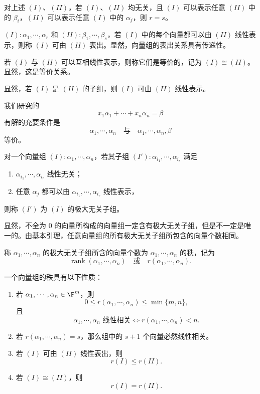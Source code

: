 \begin{corollary}
	对上述 $(I)$、$(II)$，若 $(I)$、$(II)$ 均无关，且 $(I)$ 可以表示任意 $(II)$ 中的 $\beta_i$，$(II)$ 可以表示任意 $(I)$ 中的 $\alpha_j$，则 $r=s$。
\end{corollary}

\begin{definition}\label{p1:concept:c2-l528}
	$(I):\alpha_1,\cdots,\alpha_r$ 和 $(II):\beta_1,\cdots,\beta_s$，若 $(I)$ 中的每个向量都可以由 $(II)$ 线性表示，则称 $(I)$ 可由 $(II)$ 表出。显然，向量组的表出关系具有传递性。

	若 $(I)$ 与 $(II)$ 可以互相线性表示，则称它们是等价的，记为 $(I)\cong(II)$。显然，这是等价关系。

	显然，若 $(I)$ 是 $(II)$ 的子组，则 $(I)$ 可由 $(II)$ 线性表示。

	我们研究的
	\[
	x_1\alpha_1+\cdots+x_n\alpha_n=\beta
	\]
	有解的充要条件是
	\[
	\alpha_1,\cdots,\alpha_n
	\quad\text{与}\quad
	\alpha_1,\cdots,\alpha_n,\beta
	\]
	等价。
\end{definition}

\begin{definition}\label{p1:concept:c2-l548}
	对一个向量组 $(I):\alpha_1,\cdots,\alpha_n$，若其子组
	$(I'):\alpha_{i_1},\cdots,\alpha_{i_r}$ 满足
	\begin{enumerate}
		\item $\alpha_{i_1},\cdots,\alpha_{i_r}$ 线性无关；
		\item 任意 $\alpha_j$ 都可以由 $\alpha_{i_1},\cdots,\alpha_{i_r}$ 线性表示，
	\end{enumerate}
	则称 $(I')$ 为 $(I)$ 的极大无关子组。

	显然，不全为 $0$ 的向量所构成的向量组一定含有极大无关子组，但是不一定是唯一的。由基本引理，任意向量组的所有极大无关子组所包含的向量个数相同。

	称 $\alpha_1,\cdots,\alpha_n$ 的极大无关子组所含的向量个数为
	$\alpha_1,\cdots,\alpha_n$ 的秩，记为
	\[
	\operatorname{rank}(\alpha_1,\cdots,\alpha_n)
	\quad\text{或}\quad
	r(\alpha_1,\cdots,\alpha_n).
	\]
\end{definition}

\begin{proposition}
	一个向量组的秩具有以下性质：
	\begin{enumerate}
		\item 若 $\alpha_1,\cdots,\alpha_n\in\F^m$，则
		\[
		0\leq r(\alpha_1,\cdots,\alpha_n)\leq\min\{m,n\},
		\]
		且
		\[
		\alpha_1,\cdots,\alpha_n\text{ 线性相关}
		\Longleftrightarrow
		r(\alpha_1,\cdots,\alpha_n)<n.
		\]
		\item 若 $r(\alpha_1,\cdots,\alpha_n)=s$，那么组中的 $s+1$ 个向量必然线性相关。
		\item 若 $(I)$ 可由 $(II)$ 线性表出，则
		\[
		r(I)\leq r(II).
		\]
		\item 若 $(I)\cong(II)$，则
		\[
		r(I)=r(II).
		\]
	\end{enumerate}
\end{proposition}

